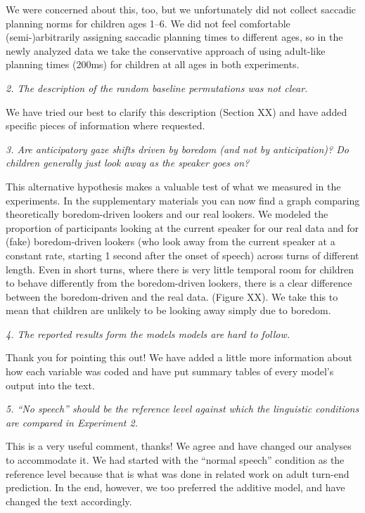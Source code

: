 \documentclass[a4paper]{letter}
\begin{document}
\begin{letter}{}
We were concerned about this, too, but we unfortunately did not collect saccadic planning norms for children ages 1--6. We did not feel comfortable (semi-)arbitrarily assigning saccadic planning times to different ages, so in the newly analyzed data we take the conservative approach of using adult-like planning times (200ms) for children at all ages in both experiments.

\smallskip

\textit{2. The description of the random baseline permutations was not clear.}

We have tried our best to clarify this description (Section XX) and have added specific pieces of information where requested.

\smallskip

\textit{3. Are anticipatory gaze shifts driven by boredom (and not by anticipation)? Do children generally just look away as the speaker goes on?}

This alternative hypothesis makes a valuable test of what we measured in the experiments. In the supplementary materials you can now find a graph comparing theoretically boredom-driven lookers and our real lookers. We modeled the proportion of participants looking at the current speaker for our real data and for (fake) boredom-driven lookers (who look away from the current speaker at a constant rate, starting 1 second after the onset of speech) across turns of different length. Even in short turns, where there is very little temporal room for children to behave differently from the boredom-driven lookers, there is a clear difference between the boredom-driven and the real data. (Figure XX). We take this to mean that children are unlikely to be looking away simply due to boredom.

\smallskip

\textit{4. The reported results form the models models are hard to follow.}

Thank you for pointing this out! We have added a little more information about how each variable was coded and have put summary tables of every model's output into the text.

\smallskip

\textit{5. ``No speech'' should be the reference level against which the linguistic conditions are compared in Experiment 2.}

This is a very useful comment, thanks! We agree and have changed our analyses to accommodate it. We had started with the ``normal speech'' condition as the reference level because that is what was done in related work on adult turn-end prediction. In the end, however, we too preferred the additive model, and have changed the text accordingly.


\end{letter}
\end{document}
